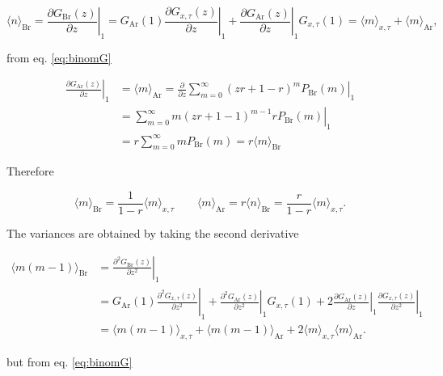 \begin{equation}
  \label{eq:bur-aveBr}
  \langle n\rangle_\text{Br} = \left.\frac{\partial G_\text{Br}(z)}{\partial z}\right|_1 = G_\text{Ar}(1)\left.\frac{\partial G_{x,\tau}(z)}{\partial z}\right|_1 + \left.\frac{\partial G_\text{Ar}(z)}{\partial z}\right|_1G_{x,\tau}(1) = \langle m\rangle_{x,\tau} + \langle m\rangle_\text{Ar},
\end{equation}

from eq. \ref{eq:binomG} 

\begin{equation*}
  \begin{split}
  \left.\frac{\partial G_\text{Ar}(z)}{\partial z}\right|_1 &= \langle m\rangle_\text{Ar} = \left.\frac{\partial}{\partial z} \sum_{m=0}^\infty(zr+1-r)^mP_\text{Br}(m)\right|_1\\
&= \left.\sum_{m=0}^\infty m(zr+1-1)^{m-1}rP_\text{Br}(m)\right|_1\\
&= r\sum_{m=0}^\infty mP_\text{Br}(m) = r\langle m\rangle_\text{Br}
  \end{split}
\end{equation*}
  
Therefore

\begin{equation}
  \label{eq:aveBrAr}
  \langle m\rangle_\text{Br} = \frac{1}{1-r}\langle m\rangle_{x,\tau}\quad\quad \langle m\rangle_\text{Ar} = r\langle n\rangle_\text{Br} = \frac{r}{1-r}\langle m\rangle_{x,\tau}.
\end{equation}

The variances are obtained by taking the second derivative

\begin{equation}
  \label{eq:2Br}
  \begin{split}
    \langle m(m-1)\rangle_\text{Br} &= \left.\frac{\partial^2 G_\text{Br}(z)}{\partial z^2}\right|_1\\
    &=G_\text{Ar}(1)\left.\frac{\partial^2 G_{x,\tau}(z)}{\partial z^2}\right|_1 + \left.\frac{\partial^2 G_\text{Ar}(z)}{\partial z^2}\right|_1G_{x,\tau}(1) + 2\left.\frac{\partial G_\text{Ar}(z)}{\partial z}\right|_1\left.\frac{\partial G_{x,\tau}(z)}{\partial z^2}\right|_1\\
    &=\langle m(m-1)\rangle_{x,\tau}+\langle m(m-1)\rangle_\text{Ar}+2\langle m\rangle_{x,\tau}\langle m\rangle_\text{Ar}.
  \end{split}
\end{equation}

but from eq. \ref{eq:binomG}

